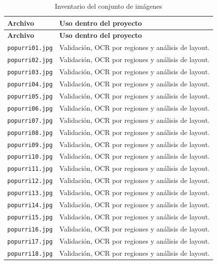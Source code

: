 \documentclass[11pt, a4paper]{article}
\begin{document}
\begin{longtable}{p{2.9cm} p{9.6cm}}
\caption{Inventario del conjunto de im\'agenes}\label{tab:inventario_imgs}\\
\toprule
\textbf{Archivo} & \textbf{Uso dentro del proyecto} \\
\midrule
\endfirsthead
\toprule
\textbf{Archivo} & \textbf{Uso dentro del proyecto} \\
\midrule
\endhead
\texttt{popurri01.jpg} & Validaci\'on, OCR por regiones y an\'alisis de layout. \\
\texttt{popurri02.jpg} & Validaci\'on, OCR por regiones y an\'alisis de layout. \\
\texttt{popurri03.jpg} & Validaci\'on, OCR por regiones y an\'alisis de layout. \\
\texttt{popurri04.jpg} & Validaci\'on, OCR por regiones y an\'alisis de layout. \\
\texttt{popurri05.jpg} & Validaci\'on, OCR por regiones y an\'alisis de layout. \\
\texttt{popurri06.jpg} & Validaci\'on, OCR por regiones y an\'alisis de layout. \\
\texttt{popurri07.jpg} & Validaci\'on, OCR por regiones y an\'alisis de layout. \\
\texttt{popurri08.jpg} & Validaci\'on, OCR por regiones y an\'alisis de layout. \\
\texttt{popurri09.jpg} & Validaci\'on, OCR por regiones y an\'alisis de layout. \\
\texttt{popurri10.jpg} & Validaci\'on, OCR por regiones y an\'alisis de layout. \\
\texttt{popurri11.jpg} & Validaci\'on, OCR por regiones y an\'alisis de layout. \\
\texttt{popurri12.jpg} & Validaci\'on, OCR por regiones y an\'alisis de layout. \\
\texttt{popurri13.jpg} & Validaci\'on, OCR por regiones y an\'alisis de layout. \\
\texttt{popurri14.jpg} & Validaci\'on, OCR por regiones y an\'alisis de layout. \\
\texttt{popurri15.jpg} & Validaci\'on, OCR por regiones y an\'alisis de layout. \\
\texttt{popurri16.jpg} & Validaci\'on, OCR por regiones y an\'alisis de layout. \\
\texttt{popurri17.jpg} & Validaci\'on, OCR por regiones y an\'alisis de layout. \\
\texttt{popurri18.jpg} & Validaci\'on, OCR por regiones y an\'alisis de layout. \\
\bottomrule
\end{longtable}
\end{document}
